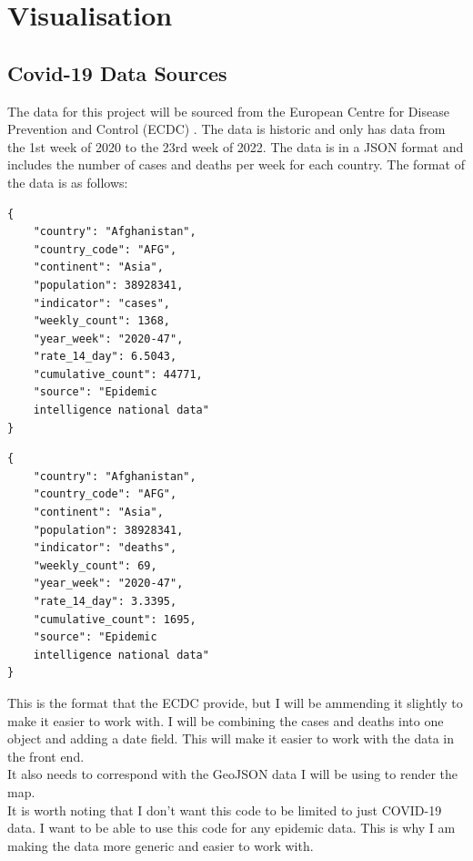 \documentclass{report}
\begin{document}
\newpage
\section{Visualisation}
\subsection{Covid-19 Data Sources}
The data for this project will be sourced from the European Centre for Disease Prevention and Control (ECDC) \cite{ecdc}. The data is historic and only has data from the 1st week of 2020 to the 23rd week of 2022. The data is in a JSON format and includes the number of cases and deaths per week for each country. The format of the data is as follows:

\begin{minipage}{0.45\textwidth}
\begin{lstlisting}[caption={Cases JSON Example}]
{
    "country": "Afghanistan",
    "country_code": "AFG",
    "continent": "Asia",
    "population": 38928341,
    "indicator": "cases",
    "weekly_count": 1368,
    "year_week": "2020-47",
    "rate_14_day": 6.5043,
    "cumulative_count": 44771,
    "source": "Epidemic
    intelligence national data"
}
\end{lstlisting}
\end{minipage}
\hfill
\begin{minipage}{0.45\textwidth}
\begin{lstlisting}[caption={Deaths JSON Example}]
{
    "country": "Afghanistan",
    "country_code": "AFG",
    "continent": "Asia",
    "population": 38928341,
    "indicator": "deaths",
    "weekly_count": 69,
    "year_week": "2020-47",
    "rate_14_day": 3.3395,
    "cumulative_count": 1695,
    "source": "Epidemic
    intelligence national data"
}
\end{lstlisting}
\end{minipage}
This is the format that the ECDC provide, but I will be ammending it slightly to make it easier to work with. I will be combining the cases and deaths into one object and adding a date field. This will make it easier to work with the data in the front end.\\
It also needs to correspond with the GeoJSON data I will be using to render the map. \\
It is worth noting that I don't want this code to be limited to just COVID-19 data. I want to be able to use this code for any epidemic data. This is why I am making the data more generic and easier to work with.\\
\newpage
\end{document}
